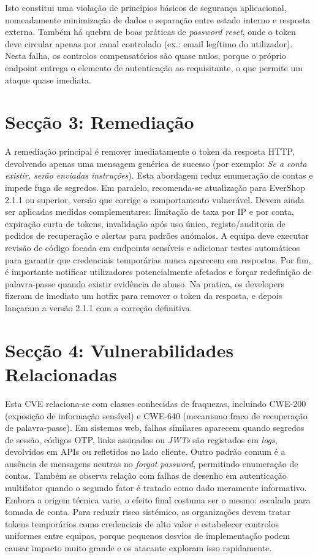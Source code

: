 \documentclass[12pt,a4paper]{article}
\begin{document}
Isto constitui uma violação de princípios básicos de segurança aplicacional, nomeadamente minimização de dados e separação entre estado interno e resposta externa. Também há quebra de boas práticas de \textit{password reset}, onde o token deve circular apenas por canal controlado (ex.: email legítimo do utilizador). Nesta falha, os controlos compensatórios são quase nulos, porque o próprio endpoint entrega o elemento de autenticação ao requisitante, o que permite um ataque quase imediata.

\section{Secção 3: Remediação}
A remediação principal é remover imediatamente o token da resposta HTTP, devolvendo apenas uma mensagem genérica de sucesso (por exemplo: \textit{Se a conta existir, serão enviadas instruções}). 
Esta abordagem reduz enumeração de contas e impede fuga de segredos. Em paralelo, recomenda-se atualização para EverShop 2.1.1 ou superior, versão que corrige o comportamento vulnerável. 
Devem ainda ser aplicadas medidas complementares: limitação de taxa por IP e por conta, expiração curta de tokens, invalidação após uso único, registo/auditoria de pedidos de recuperação e alertas para padrões anómalos. 
A equipa deve executar revisão de código focada em endpoints sensíveis e adicionar testes automáticos para garantir que credenciais temporárias nunca aparecem em respostas. 
Por fim, é importante notificar utilizadores potencialmente afetados e forçar redefinição de palavra-passe quando existir evidência de abuso.
Na pratica, os developers fizeram de imediato um hotfix para remover o token da resposta, e depois lançaram a versão 2.1.1 com a correção definitiva.

\section{Secção 4: Vulnerabilidades Relacionadas}
Esta CVE relaciona-se com classes conhecidas de fraquezas, incluindo CWE-200 (exposição de informação sensível) e CWE-640 (mecanismo fraco de recuperação de palavra-passe).
 Em sistemas web, falhas similares aparecem quando segredos de sessão, códigos OTP, links assinados ou \textit{JWTs} são registados em \textit{logs}, devolvidos em APIs ou refletidos no lado cliente. 
 Outro padrão comum é a ausência de mensagens neutras no \textit{forgot password}, permitindo enumeração de contas. 
 Também se observa relação com falhas de desenho em autenticação multifator quando o segundo fator é tratado como dado meramente informativo. 
 Embora a origem técnica varie, o efeito final costuma ser o mesmo: escalada para tomada de conta. Para reduzir risco sistémico, as organizações devem tratar tokens temporários como credenciais de alto valor e estabelecer controlos uniformes entre equipas, porque pequenos desvios de implementação podem causar impacto muito grande e os atacante exploram isso rapidamente.
\end{document}
